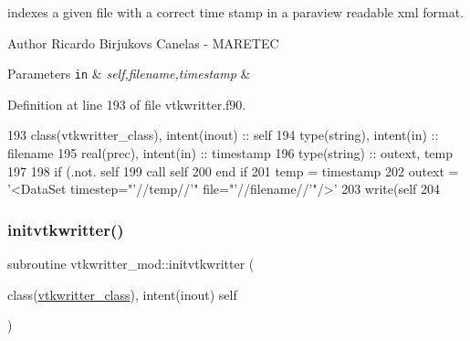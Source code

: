 indexes a given file with a correct time stamp in a paraview readable xml format. 

\begin{DoxyAuthor}{Author}
Ricardo Birjukovs Canelas -\/ M\+A\+R\+E\+T\+EC 
\end{DoxyAuthor}

\begin{DoxyParams}[1]{Parameters}
\mbox{\tt in}  & {\em self,filename,timestamp} & \\
\hline
\end{DoxyParams}


Definition at line 193 of file vtkwritter.\+f90.


\begin{DoxyCode}
193     \textcolor{keywordtype}{class}(vtkwritter\_class), \textcolor{keywordtype}{intent(inout)} :: self
194     \textcolor{keywordtype}{type}(string), \textcolor{keywordtype}{intent(in)} :: filename
195     \textcolor{keywordtype}{real(prec)}, \textcolor{keywordtype}{intent(in)} :: timestamp
196     \textcolor{keywordtype}{type}(string) :: outext, temp
197 
198     \textcolor{keywordflow}{if} (.not. self%
199         \textcolor{keyword}{call }self%
200 \textcolor{keywordflow}{    end if}
201     temp = timestamp
202     outext = \textcolor{stringliteral}{'<DataSet timestep="'}//temp//\textcolor{stringliteral}{'" file="'}//filename//\textcolor{stringliteral}{'"/>'}
203     \textcolor{keyword}{write}(self%
204 
\end{DoxyCode}
\mbox{\label{namespacevtkwritter__mod_abd35d591c8e15730a277b2d26deb83e8}} 
\subsubsection{\texorpdfstring{initvtkwritter()}{initvtkwritter()}}
{\footnotesize\ttfamily subroutine vtkwritter\+\_\+mod\+::initvtkwritter (\begin{DoxyParamCaption}\item[{class(\mbox{\hyperlink{structvtkwritter__mod_1_1vtkwritter__class}{vtkwritter\+\_\+class}}), intent(inout)}]{self }\end{DoxyParamCaption})\hspace{0.3cm}{\ttfamily [private]}}



